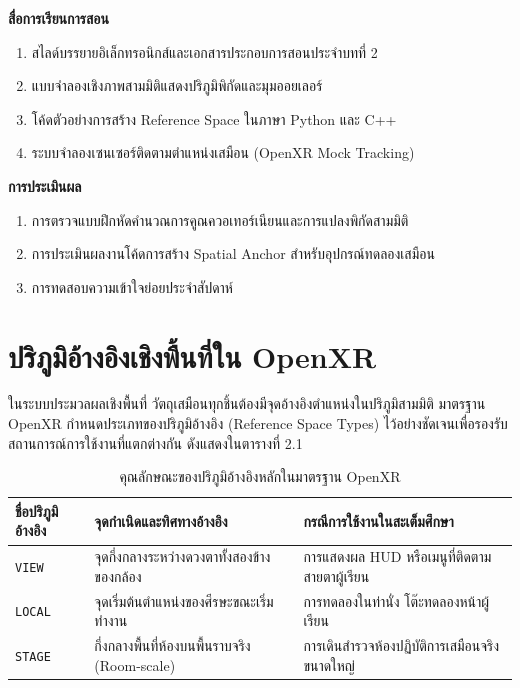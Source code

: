 \noindent\textbf{สื่อการเรียนการสอน}
\begin{enumerate}
    \item สไลด์บรรยายอิเล็กทรอนิกส์และเอกสารประกอบการสอนประจำบทที่ 2
    \item แบบจำลองเชิงภาพสามมิติแสดงปริภูมิพิกัดและมุมออยเลอร์
    \item โค้ดตัวอย่างการสร้าง Reference Space ในภาษา Python และ C++
    \item ระบบจำลองเซนเซอร์ติดตามตำแหน่งเสมือน (OpenXR Mock Tracking)
\end{enumerate}

\noindent\textbf{การประเมินผล}
\begin{enumerate}
    \item การตรวจแบบฝึกหัดคำนวณการคูณควอเทอร์เนียนและการแปลงพิกัดสามมิติ
    \item การประเมินผลงานโค้ดการสร้าง Spatial Anchor สำหรับอุปกรณ์ทดลองเสมือน
    \item การทดสอบความเข้าใจย่อยประจำสัปดาห์
\end{enumerate}

\newpage

\section{ปริภูมิอ้างอิงเชิงพื้นที่ใน OpenXR}

ในระบบประมวลผลเชิงพื้นที่ วัตถุเสมือนทุกชิ้นต้องมีจุดอ้างอิงตำแหน่งในปริภูมิสามมิติ มาตรฐาน OpenXR กำหนดประเภทของปริภูมิอ้างอิง (Reference Space Types) ไว้อย่างชัดเจนเพื่อรองรับสถานการณ์การใช้งานที่แตกต่างกัน ดังแสดงในตารางที่ 2.1

\begin{table}[htbp]
\centering
\caption{คุณลักษณะของปริภูมิอ้างอิงหลักในมาตรฐาน OpenXR}
\label{tab:openxr_spaces}
\begin{tabularx}{\textwidth}{lYY}
\toprule
\textbf{ชื่อปริภูมิอ้างอิง} & \textbf{จุดกำเนิดและทิศทางอ้างอิง} & \textbf{กรณีการใช้งานในสะเต็มศึกษา} \\
\midrule
\texttt{VIEW} & จุดกึ่งกลางระหว่างดวงตาทั้งสองข้างของกล้อง & การแสดงผล HUD หรือเมนูที่ติดตามสายตาผู้เรียน \\
\texttt{LOCAL} & จุดเริ่มต้นตำแหน่งของศีรษะขณะเริ่มทำงาน & การทดลองในท่านั่ง โต๊ะทดลองหน้าผู้เรียน \\
\texttt{STAGE} & กึ่งกลางพื้นที่ห้องบนพื้นราบจริง (Room-scale) & การเดินสำรวจห้องปฏิบัติการเสมือนจริงขนาดใหญ่ \\
\bottomrule
\end{tabularx}
\end{table}


